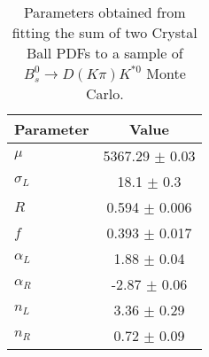 \begin{table}[h]
  \centering
  \begin{tabular}{lc}
      \toprule
      Parameter & Value \\
      \midrule
      $\mu$ & 5367.29 $\pm$ 0.03 \\
      $\sigma_L$ & 18.1 $\pm$ 0.3 \\
      $R$ & 0.594 $\pm$ 0.006 \\
      $f$ & 0.393 $\pm$ 0.017 \\
      $\alpha_L$ & 1.88 $\pm$ 0.04 \\
      $\alpha_R$ & -2.87 $\pm$ 0.06 \\
      $n_L$ & 3.36 $\pm$ 0.29 \\
      $n_R$ & 0.72 $\pm$ 0.09 \\
  \bottomrule
  \end{tabular}
  \caption{Parameters obtained from fitting the sum of two Crystal Ball PDFs to a sample of $B^0_s \to D(K\pi)K^{*0}$ Monte Carlo.}
\label{tab:signal_Bs_MC_params}
\end{table}
